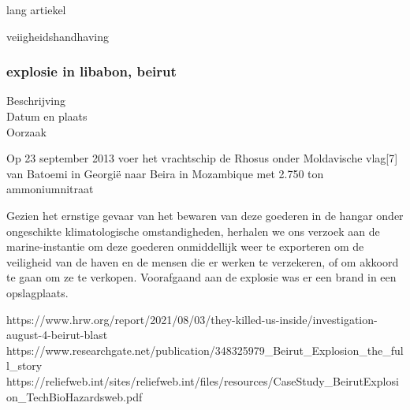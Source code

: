 {{lang artiekel
\cite{CBodeen15082015TanjinExplosion}

\cite{reutersTanjinInsurance}
\cite{yu082016evaluationTanjin2015}
\cite{wiki2015TanjinExplosions}
\cite{bbc17082015whathappenedTanjin}
\cite{mortimer19082016taijinexplosioncrater}
veiigheidshandhaving
\cite{internationallabourofficeChmControlTooliit}

\cite{euTaxationCustomsICSC}
\cite{iloWHOChemSafetyCards}

\subsubsection{explosie in libabon, beirut }
\begin{description}
\item[Beschrijving]
\item[Datum en plaats] 
\item[Oorzaak]
\end{description}
Op 23 september 2013 voer het vrachtschip de Rhosus onder Moldavische vlag[7] van Batoemi in Georgië naar Beira in Mozambique met 2.750 ton ammoniumnitraat

Gezien het ernstige gevaar van het bewaren van deze goederen in de hangar onder ongeschikte klimatologische omstandigheden, herhalen we ons verzoek aan de marine-instantie om deze goederen onmiddellijk weer te exporteren om de veiligheid van de haven en de mensen die er werken te verzekeren, of om akkoord te gaan om ze te verkopen.
Voorafgaand aan de explosie was er een brand in een opslagplaats. 

https://www.hrw.org/report/2021/08/03/they-killed-us-inside/investigation-august-4-beirut-blast 
\cite{hrw03082021investigateBeirutBlast}
https://www.researchgate.net/publication/348325979_Beirut_Explosion_the_full_story 
\cite{souaibyElHussein112020Beirutstory}
https://reliefweb.int/sites/reliefweb.int/files/resources/CaseStudy_BeirutExplosion_TechBioHazardsweb.pdf 
\cite{ifrc2020chemicalexplosionBeirutPort}

}}

